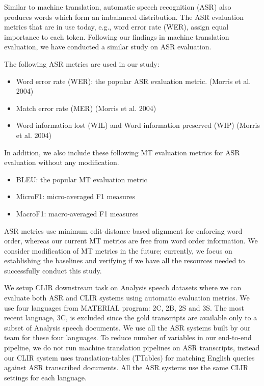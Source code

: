 Similar to machine translation, automatic speech recognition (ASR) also produces words which form an imbalanced distribution. The ASR evaluation metrics that are in use today, e.g., word error rate (WER), assign equal importance to each token. Following our findings in machine translation evaluation, we have conducted a similar study on ASR evaluation.
 
The following ASR metrics are used in our study:
\begin{itemize}
\item Word error rate (WER):  the popular ASR evaluation metric. (Morris et al. 2004)
\item Match error rate (MER) (Morris et al. 2004)
\item Word information lost (WIL) and Word information preserved (WIP) (Morris et al. 2004)
\end{itemize}


In addition, we also include these following MT evaluation metrics for ASR evaluation without any modification.
\begin{itemize}
\item BLEU: the popular MT evaluation metric \cite{papineni-etal-2002-bleu}
\item MicroF1: micro-averaged F1 measures \cite{gowda2021macroaverage}
\item MacroF1: macro-averaged F1 measures \cite{gowda2021macroaverage}
\end{itemize}


ASR metrics use minimum edit-distance based alignment for enforcing word order, whereas our current MT metrics are free from word order information. We consider modification of MT metrics in the future; currently, we focus on establishing the baselines and verifying if we have all the resources needed to successfully conduct this study.

We setup CLIR downstream task on Analysis speech datasets where we can evaluate both ASR and CLIR systems using automatic evaluation metrics. We use four languages from MATERIAL program: 2C, 2B, 2S and 3S. The most recent language, 3C, is excluded since the gold transcripts are available only to a subset of Analysis speech documents. We use all the ASR systems built by our team for these four languages. To reduce number of variables in our end-to-end pipeline, we do not run machine translation pipelines on ASR transcripts, instead our CLIR system uses translation-tables (TTables) for matching English queries against ASR transcribed documents. All the ASR systems use the same CLIR settings for each language.
 

